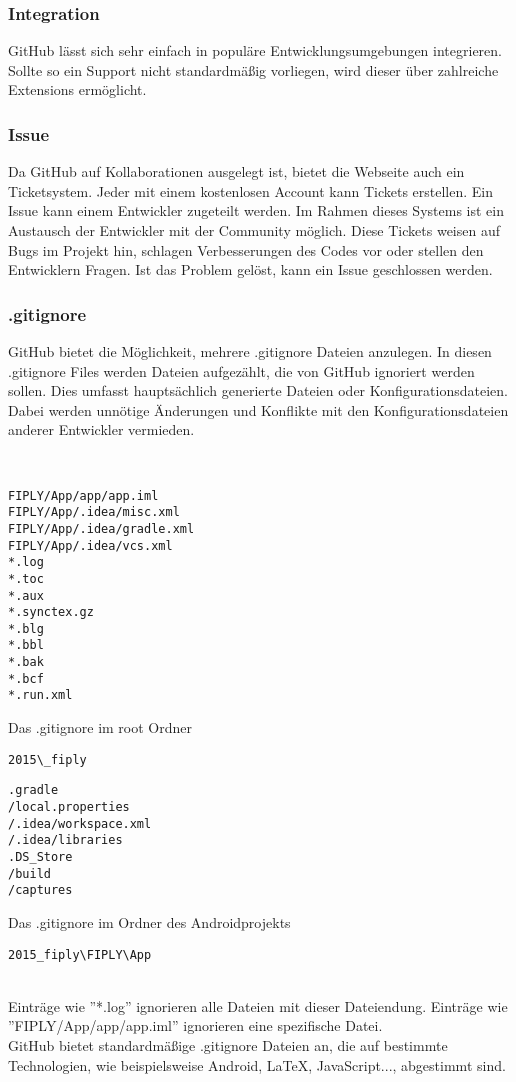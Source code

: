 \documentclass[FIPLY_base.tex]{subfiles}
\begin{document}
\subsubsection{Integration}
GitHub lässt sich sehr einfach in populäre Entwicklungsumgebungen integrieren. 
Sollte so ein Support nicht standardmäßig vorliegen, wird dieser über zahlreiche Extensions ermöglicht.

\subsubsection{Issue}
Da GitHub auf Kollaborationen ausgelegt ist, bietet die Webseite auch ein Ticketsystem.
Jeder mit einem kostenlosen Account kann Tickets erstellen. Ein Issue kann einem Entwickler zugeteilt werden.
Im Rahmen dieses Systems ist ein Austausch der Entwickler mit der Community möglich.
Diese Tickets weisen auf Bugs im Projekt hin, schlagen Verbesserungen des Codes vor oder stellen den Entwicklern Fragen.
Ist das Problem gelöst, kann ein Issue geschlossen werden.

\subsubsection{.gitignore}
GitHub bietet die Möglichkeit, mehrere .gitignore Dateien anzulegen.
In diesen .gitignore Files werden Dateien aufgezählt, die von GitHub ignoriert werden sollen. 
Dies umfasst hauptsächlich generierte Dateien oder Konfigurationsdateien.
Dabei werden unnötige Änderungen und Konflikte mit den Konfigurationsdateien anderer Entwickler vermieden. 

\ \\
\begin{minipage}{.45\textwidth}
\begin{lstlisting}
FIPLY/App/app/app.iml
FIPLY/App/.idea/misc.xml
FIPLY/App/.idea/gradle.xml
FIPLY/App/.idea/vcs.xml
*.log
*.toc
*.aux
*.synctex.gz
*.blg
*.bbl
*.bak
*.bcf
*.run.xml
\end{lstlisting}
Das .gitignore im root Ordner \begin{verbatim}2015\_fiply\end{verbatim}
\end{minipage}\hfill
\begin{minipage}{.45\textwidth}
\begin{lstlisting}
.gradle
/local.properties
/.idea/workspace.xml
/.idea/libraries
.DS_Store
/build
/captures
\end{lstlisting}
Das .gitignore im Ordner des Androidprojekts \begin{verbatim}2015_fiply\FIPLY\App\end{verbatim} 
\end{minipage}
\ \\
Einträge wie ''*.log'' ignorieren alle Dateien mit dieser Dateiendung. \newline
Einträge wie ''FIPLY/App/app/app.iml'' ignorieren eine spezifische Datei.
\ \\
GitHub bietet standardmäßige .gitignore Dateien an, die auf bestimmte Technologien, wie beispielsweise Android, LaTeX, JavaScript...,  abgestimmt sind.
\end{document}
